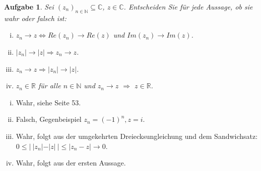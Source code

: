 \documentclass[a4paper, 20]{exam}
\newtheorem{ex}{Aufgabe}
\newcommand\CC{\mathbb{C}}
\newcommand\RR{\mathbb{R}}
\newcommand\NN{\mathbb{N}}
\begin{document}
\begin{ex} Sei $(z_n)_{n\in \NN} \subseteq \CC$, $z\in \CC$. Entscheiden Sie f\"ur jede Aussage, ob sie wahr oder falsch ist:


\begin{enumerate}[i.)]
\item
$z_n \longrightarrow z \Longleftrightarrow Re(z_n) \longrightarrow Re(z)$ und $Im(z_n) \longrightarrow Im(z)$.

\item
$\vert z_n \vert \longrightarrow \vert z \vert \Longrightarrow z_n \longrightarrow z$.

\item
$z_n \longrightarrow z \Longrightarrow \vert z_n \vert \longrightarrow \vert z \vert$.

\item
$z_n \in \RR$ f\"ur alle $n\in \NN$ und $z_n \longrightarrow z$ $\Longrightarrow$ $z\in \RR$. 

\end{enumerate}

\end{ex}
\begin{solution}

\begin{enumerate}[i.)]
\item
Wahr, siehe Seite 53.
\item
Falsch, Gegenbeispiel $z_n=(-1)^n, z=i$.
\item
Wahr, folgt aus der umgekehrten Dreiecksungleichung und dem Sandwichsatz:\\
$0\leq \big\vert \ \vert z_n \vert - \vert z \vert \ \big\vert \leq \vert z_n - z \vert \longrightarrow 0$.
\item
Wahr, folgt aus der ersten Aussage.
\end{enumerate}

\end{solution}
\end{document}
